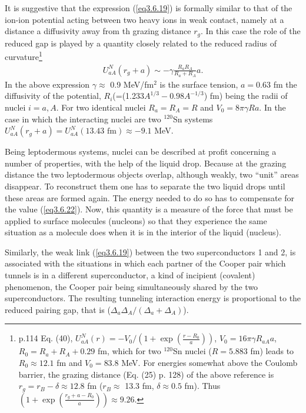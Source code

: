  
 It is suggestive that the expression (\ref{eq3.6.19}) is formally similar to that of the ion-ion potential acting between two heavy ions in weak contact, namely at a distance  a diffusivity away from th grazing distance $r_g$. In this case the role of the reduced gap is played by a quantity closely related to the reduced radius of curvature\footnote{\cite{Broglia:04a} p.114  Eq. (40), $U_{aA}^{N}(r)=-V_0/(1+\exp(\frac{r-R_0}{a}))$, $V_0=16\pi\gamma R_{aA}a$, $R_0=R_a+R_A+0.29$ fm, which for two $^{120}$Sn nuclei ($R=5.883$ fm) leads to $R_0\approx12.1$ fm and $V_0=83.8$ MeV. For energies somewhat above the Coulomb barrier, the grazing distance (Eq. (25) p. 128) of the above reference is $r_g=r_B-\delta\approx12.8$ fm ($r_B\approx$ 13.3 fm, $\delta\approx0.5$ fm). Thus $(1+\exp(\frac{r_g+a-R_0}{a}))\approx9.26$.}
 \begin{align}\label{eq3.6.22}
 U_{aA}^N(r_g+a)\sim -\gamma\frac{R_aR_A}{R_a+R_A}a.
 \end{align}
 In the above expression $\gamma\approx$ 0.9 MeV/fm$^2$ is the surface tension, $a=0.63$ fm the diffusivity of the potential, $R_i$(=(1.233$A^{1/3}-0.98A^{-1/3}$) fm) being the radii of nuclei $i=a,A$. For two identical nuclei $R_a=R_A=R$ and $V_0=8\pi\gamma R a$. In the case in which the interacting nuclei are two  $^{120}$Sn systems  $U_{aA}^N(r_g+a)=U_{aA}^N(13.43 \text{ fm})\approx-9.1$ MeV.
 
 
 
Being leptodermous systems, nuclei can be described at profit concerning a number of properties, with the help of the liquid drop. Because at the grazing distance the two leptodermous objects overlap, although weakly, two ``unit'' areas disappear. To reconstruct them one has to separate the two liquid drops until these areas are formed again. The energy needed to do so has to compensate for the value (\ref{eq3.6.22}).  Now, this quantity is a measure of the force that must be applied to surface molecules (nucleons) so that they experience the same situation as a molecule does when it is in the interior of the liquid (nucleus). 
  
   
 Similarly, the weak link (\ref{eq3.6.19}) between the two superconductors 1 and 2, is associated with the situations in which each partner of the Cooper pair which tunnels is in a different superconductor, a kind of incipient (covalent) phenomenon, the Cooper pair being simultaneously shared by the two superconductors. The resulting tunneling interaction energy is proportional to the reduced pairing gap, that is ($\Delta_a\Delta_A/(\Delta_a+\Delta_A)$). 
